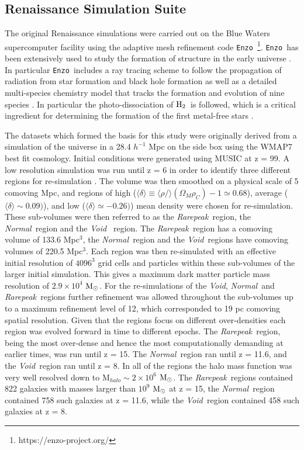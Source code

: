 \documentclass[graphics, twocolumn, usenatbib]{mn2e}
\newcommand{\enzo}{\texttt{Enzo~}}
\newcommand{\mpch} {\rm $h^{-1}$ Mpc\,\,}
\newcommand{\msolar} {$\rm{M_{\odot}}~$}
\newcommand{\msolarc} {$\rm{M_{\odot}}$}
\newcommand{\molH} {$\rm{H_2}$~}
\newcommand{\rarepeak} {\textit{Rarepeak~}}
\newcommand{\normal} {\textit{Normal~}}
\newcommand{\void} {\textit{Void~}}
\newcommand{\voidc} {\textit{Void}}
\begin{document}
\subsection{Renaissance Simulation Suite} \label{Sec:Renaissance}
The original Renaissance simulations were carried out on the Blue Waters supercomputer facility
using the adaptive mesh refinement code \enzo\citep{Enzo_2014, Enzo_2019}\footnote{https://enzo-project.org/}.
\enzo has been extensively used to study the formation of structure in the early universe
\citep{Abel_2002, OShea_2005b, Turk_2012, Wise_2012b, Wise_2014, Regan_2015, Regan_2017}.
In particular \enzo includes a ray tracing scheme to follow the propagation of radiation from
star formation and black hole formation \citep{WiseAbel_2011} as well as a detailed multi-species
chemistry model that tracks the formation and evolution of nine species \citep{Anninos_1997,
  Abel_1997}. In particular the photo-dissociation of \molH is followed, which is a critical
ingredient for determining the formation of the first metal-free stars \citep{Abel_2000}. 



The datasets which formed the basis for this study were originally derived from a simulation of the
universe in a 28.4 \mpch on the side box using the WMAP7 best fit cosmology. Initial conditions
were generated using MUSIC \citep{Hahn_2011} at z = 99. A low resolution simulation was run until
z = 6 in order to identify three different regions for re-simulation \citep{Chen_2014}. The volume
was then smoothed on a physical scale of 5 comoving Mpc, and regions of high
($\langle\delta\rangle \equiv \langle\rho/\rangle(\Omega_M \rho_C) - 1 \simeq 0.68$),
average ($\langle\delta\rangle \sim 0.09)$), and low ($\langle\delta\rangle \simeq -0.26)$)
 mean density were chosen for re-simulation. 
 These sub-volumes were then referred to as the \rarepeak region, the \normal region  and the \void
 region. The \rarepeak region has a comoving volume of 133.6 Mpc$^3$, the \normal region and
 the \void regions have comoving volumes of 220.5 Mpc$^3$. Each region was then re-simulated with
 an effective initial resolution of $4096^3$ grid cells and particles within these sub-volumes of
 the larger initial simulation. This gives a maximum dark matter particle mass resolution
 of $2.9 \times 10^4$ \msolarc. For the re-simulations of the \voidc, \normal and \rarepeak regions
 further refinement was allowed throughout the sub-volumes up to a maximum refinement level of 12,
 which corresponded to 19 pc comoving spatial resolution. Given that the regions focus on different
 over-densities each region was evolved forward in time to different epochs. The \rarepeak region,
 being the most over-dense and hence the most computationally demanding at earlier times, was run
 until z = 15. The \normal region ran until z = 11.6, and the \void region ran until z = 8. In all
 of the regions the halo mass function was very well resolved down to M$_{halo} \sim 2 \times 10^6$
 \msolarc. The \rarepeak regions contained 822 galaxies with masses larger than $10^9$ \msolar at
 z = 15, the \normal region contained 758 such galaxies at z = 11.6, while the \void region
 contained 458 such galaxies at z = 8. 
\end{document}
